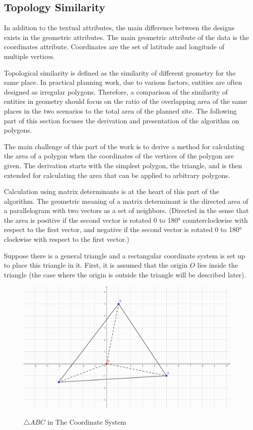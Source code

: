 \subsection*{Topology Similarity}
In addition to the textual attributes, the main difference between the designs exists in the geometric attributes. The main geometric attribute of the data is the coordinates attribute. Coordinates are the set of latitude and longitude of multiple vertices.

Topological similarity is defined as the similarity of different geometry for the same place. In practical planning work, due to various factors, entities are often designed as irregular polygons. Therefore, a comparison of the similarity of entities in geometry should focus on the ratio of the overlapping area of the same places in the two scenarios to the total area of the planned site. The following part of this section focuses the derivation and presentation of the algorithm on polygons.

The main challenge of this part of the work is to derive a method for calculating the area of a polygon when the coordinates of the vertices of the polygon are given. The derivation starts with the simplest polygon, the triangle, and is then extended for calculating the area that can be applied to arbitrary polygons.

Calculation using matrix determinants is at the heart of this part of the algorithm. The geometric meaning of a matrix determinant is the directed area of a parallelogram with two vectors as a set of neighbors. (Directed in the sense that the area is positive if the second vector is rotated 0 to 180° counterclockwise with respect to the first vector, and negative if the second vector is rotated 0 to 180° clockwise with respect to the first vector.)

Suppose there is a general triangle and a rectangular coordinate system is set up to place this triangle in it. First, it is assumed that the origin $O$ lies inside the triangle (the case where the origin is outside the triangle will be described later).

\begin{figure}[H]
\caption{$\triangle ABC$ in The Coordinate System}
\centering
\includegraphics[scale=0.5]{pic2.png}
\label{topo1}
\end{figure}

